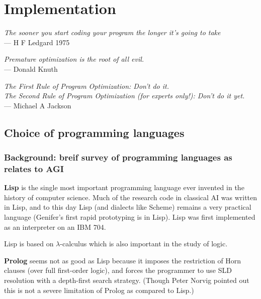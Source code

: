 \chapter{Implementation}

\begin{flushright}
\emph{The sooner you start coding your program the longer it's going to take}\\
--- H F Ledgard 1975
\end{flushright}

\begin{flushright}
\emph{Premature optimization is the root of all evil.}\\
--- Donald Knuth
\end{flushright}

\begin{flushright}
\emph{The First Rule of Program Optimization: Don't do it.\\
The Second Rule of Program Optimization (for experts only!): Don't do it yet.}\\
--- Michael A Jackson
\end{flushright}

\minitoc

\section{Choice of programming languages}

\subsection{Background: breif survey of programming languages as relates to AGI}

\textbf{Lisp} is the single most important programming language ever invented in the history of computer science.  Much of the research code in classical AI was written in Lisp, and to this day Lisp (and dialects like Scheme) remains a very practical language (Genifer's first rapid prototyping is in Lisp).  Lisp was first implemented as an interpreter on an IBM 704.

Lisp is based on $\lambda$-calculus which is also important in the study of logic.

\textbf{Prolog} seems not as good as Lisp because it imposes the restriction of Horn clauses (over full first-order logic), and forces the programmer to use SLD resolution with a depth-first search strategy.  (Though Peter Norvig pointed out this is not a severe limitation of Prolog as compared to Lisp.)

